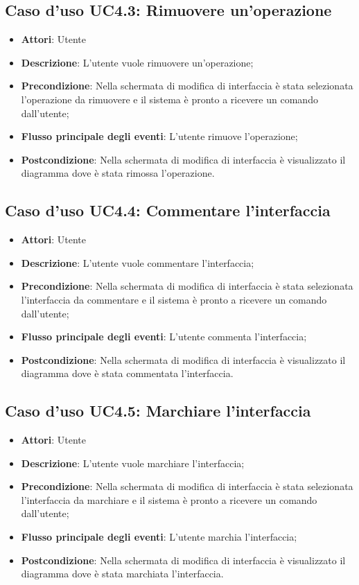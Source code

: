 \documentclass[../AnalisiDeiRequisiti.tex]{subfiles}
\begin{document}
			\subsection{Caso d'uso UC4.3: Rimuovere un'operazione}
			\begin{itemize}
				\item \textbf{Attori}: Utente
				\item \textbf{Descrizione}: L'utente vuole rimuovere un'operazione;
				\item \textbf{Precondizione}: Nella schermata di modifica di interfaccia è stata selezionata l'operazione da rimuovere e il sistema è pronto a ricevere un comando dall'utente;
				\item \textbf{Flusso principale degli eventi}: L'utente rimuove l'operazione;
				\item \textbf{Postcondizione}: Nella schermata di modifica di interfaccia è visualizzato il diagramma dove è stata rimossa l'operazione.
			\end{itemize}
			\subsection{Caso d'uso UC4.4: Commentare l'interfaccia}
			\begin{itemize}
				\item \textbf{Attori}: Utente
				\item \textbf{Descrizione}: L'utente vuole commentare l'interfaccia;
				\item \textbf{Precondizione}: Nella schermata di modifica di interfaccia è stata selezionata l'interfaccia da commentare e il sistema è pronto a ricevere un comando dall'utente;
				\item \textbf{Flusso principale degli eventi}: L'utente commenta l'interfaccia;
				\item \textbf{Postcondizione}: Nella schermata di modifica di interfaccia è visualizzato il diagramma dove è stata commentata l'interfaccia.
			\end{itemize}
			\subsection{Caso d'uso UC4.5: Marchiare l'interfaccia}
			\begin{itemize}
				\item \textbf{Attori}: Utente
				\item \textbf{Descrizione}: L'utente vuole marchiare l'interfaccia;
				\item \textbf{Precondizione}: Nella schermata di modifica di interfaccia è stata selezionata l'interfaccia da marchiare e il sistema è pronto a ricevere un comando dall'utente;
				\item \textbf{Flusso principale degli eventi}: L'utente marchia l'interfaccia;
				\item \textbf{Postcondizione}: Nella schermata di modifica di interfaccia è visualizzato il diagramma dove è stata marchiata l'interfaccia.
			\end{itemize}
\end{document}
